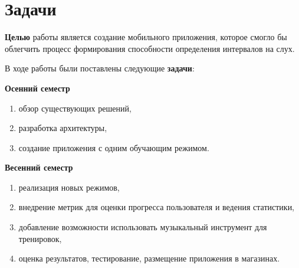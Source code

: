 \titleformat{\chapter}[display]
  {\normalfont\bfseries}{}{0pt}{\Huge}
\chapter{Задачи}

\textbf{Целью} работы является создание мобильного приложения, которое смогло бы облегчить процесс формирования способности определения интервалов на слух. \medskip\par
В ходе работы были поставлены следующие \textbf{задачи}:\par
\bigskip
\textbf{Осенний семестр}
\begin{enumerate}
\item обзор существующих решений,
\item разработка архитектуры,
\item создание приложения с одним обучающим режимом.
\end{enumerate}\par
\bigskip
\textbf{Весенний семестр} 
\begin{enumerate}
\item реализация новых режимов,
\item внедрение метрик для оценки прогресса пользователя и ведения статистики,
\item добавление возможности использовать музыкальный инструмент для тренировок,
\item оценка результатов, тестирование, размещение приложения в магазинах.
\end{enumerate}\par
